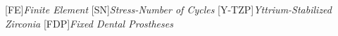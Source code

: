 [FE]{\emph{Finite Element}}
[SN]{\emph{Stress-Number of Cycles}}
[Y-TZP]{\emph{Yttrium-Stabilized Zirconia}}
[FDP]{\emph{Fixed Dental Prostheses}}